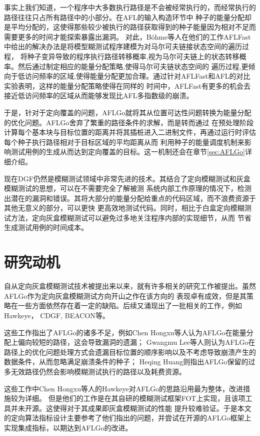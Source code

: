 \documentclass[bachelor]{njupthesis}
\begin{document}
事实上我们知道，一个程序中大多数执行路径是不会被经常执行的，而经常执行的路径往往只占所有路径中的小部分。在AFL的输入构造环节中
种子的能量分配却是平均分配的，这使得那些较少被执行的路径获取得到的种子能量因为相对不足而需要更多的时间才能探索暴露出漏洞。
对此，Böhme等人在他们的工作AFLFast\cite{2016Coverage}中给出的解决办法是将模型糊测试程序建模为对马尔可夫链接状态空间的遍历过程，
将种子变异导致的程序执行路径转移概率,视为马尔可夫链上的状态转移概率。然后通过制定相应的能量分配策略,使得马尔可夫链状态空间的
遍历过程,更倾向于低访问频率的区域,使得能量分配更加合理。通过针对AFLFast和AFL的对比实验表明，这样的能量分配策略使得在同样的
时间中，AFLFast有更多的机会去接近低访问频率的区域从而能够发现比AFL多指数级的崩溃\cite{2016Coverage}。

于是，针对于定向覆盖的问题，AFLGo就将其从位置可达性问题转换为能量分配的优化问题。AFLGo舍弃了繁重的路径条件的求解，而是转而通过
在预处理阶段计算每个基本块与目标位置的距离并将其插桩进入二进制文件，再通过运行时评估每个种子执行路径相对于目标区域的平均距离从而
利用种子的能量调度机制来影响测试用例的生成从而达到定向覆盖的目标。这一机制还会在章节\ref{sec:AFLGo}详细介绍。

现在DGF仍然是模糊测试领域中非常先进的技术。其结合了定向模糊测试和灰盒模糊测试的思想，可以在不需要完全了解被测
系统内部工作原理的情况下，检测出潜在的漏洞和错误。其将大部分的能量分配给重点的代码区域，而不浪费资源于其他无意义的部分，可以更快
更高效地测试代码。同时，相比于白盒定向模糊测试方法，定向灰盒模糊测试可以避免过多地关注程序内部的实现细节，从而
节省生成测试用例的时间成本。

\section{研究动机}
自从定向灰盒模糊测试技术被提出来以来，就有许多相关的研究工作被提出。虽然AFLGo作为定向灰盒模糊测试方向开山之作在该方向的
表现卓有成效，但是其策略在一些方面依然存在着一定的缺陷。后续又涌现出了一批相关的工作，例如Hawkeye\cite{chen2018hawkeye}， 
CDGF\cite{lee2021constraint}, BEACON\cite{huang2022beacon}等。

这些工作指出了AFLGo的诸多不足，例如Chen Hongxu等人认为AFLGo在能量分配上偏向较短的路径，这会导致漏洞的遗漏\cite{chen2018hawkeye}；
Gwangmu Lee等人则认为AFLGo在路径上的优化问题处理方式会遗漏目标位置的顺序影响以及不考虑导致崩溃产生的数据条件，从而忽略满足崩溃条件的种子\cite{lee2021constraint}；
Heqing Huang则指出AFLGo保留的过多无效路径仍然会影响模糊测试执行的路径以及耗费资源\cite{huang2022beacon}。

这些工作中Chen Hongxu等人的Hawkeye\cite{chen2018hawkeye}对AFLGo的思路沿用最为整体，改进措施较为详细。
但是他们的工作是在其自研的模糊测试框架FOT\cite{chen2018fot}上实现，且该项工具并未开源。这使得对于其成果即灰盒模糊测试的性能
提升较难验证。于是本文的定向算法指标设计主要参考了他们指出的问题，并尝试在开源的AFLGo框架上实现集成指标，以期达到AFLGo的改进。
\end{document}
